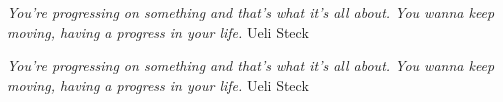 \thispagestyle{empty}
\vspace*{\fill}
\emph{
    You're progressing on something and that's what it's all about. You wanna keep moving, having a progress in your life.
}
\vspace{2cm}
\hfill Ueli Steck

\vspace{4cm}

\emph{
    You're progressing on something and that's what it's all about. You wanna keep moving, having a progress in your life.
}
\vspace{2cm}
\hfill Ueli Steck
\vspace*{\fill}


